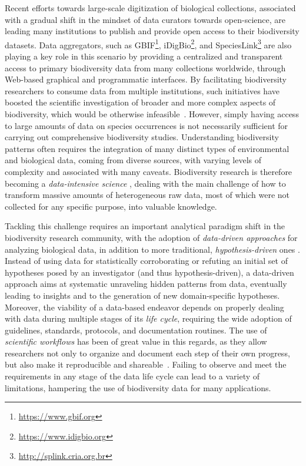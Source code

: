 Recent efforts towards large-scale digitization of biological collections, associated with a gradual shift in the mindset of data curators towards open-science, are leading many institutions to publish and provide open access to their biodiversity datasets.
Data aggregators, such as GBIF\footnote{\url{https://www.gbif.org}}, iDigBio\footnote{\url{https://www.idigbio.org}}, and SpeciesLink\footnote{\url{http://splink.cria.org.br}} are also playing a key role in this scenario by providing a centralized and transparent access to primary biodiversity data from many collections worldwide, through Web-based graphical and programmatic interfaces.
By facilitating biodiversity researchers to consume data from multiple institutions, such initiatives have boosted the scientific investigation of broader and more complex aspects of biodiversity, which would be otherwise infeasible~\cite{James2018, Newbold2015}.
However, simply having access to large amounts of data on species occurrences is not necessarily sufficient for carrying out comprehensive biodiversity studies.
Understanding biodiversity patterns often requires the integration of many distinct types of environmental and biological data, coming from diverse sources, with varying levels of complexity and associated with many caveats.
Biodiversity research is therefore becoming a \textit{data-intensive science} \cite{Kelling2009}, dealing with the main challenge of how to transform massive amounts of heterogeneous raw data, most of which were not collected for any specific purpose, into valuable knowledge.

Tackling this challenge requires an important analytical paradigm shift in the biodiversity research community, with the adoption of \textit{data-driven approaches} for analyzing biological data, in addition to more traditional, \textit{hypothesis-driven} ones \cite{Kelling2009}.
Instead of using data for statistically corroborating or refuting an initial set of hypotheses posed by an investigator (and thus hypothesis-driven), a data-driven approach aims at systematic unraveling hidden patterns from data, eventually leading to insights and to the generation of new domain-specific hypotheses.
%
Moreover, the viability of a data-based endeavor depends on properly dealing with data during multiple stages of its \textit{life cycle}, requiring the wide adoption of guidelines, standards, protocols, and documentation routines.
The use of \textit{scientific workflows} has been of great value in this regards, as they allow researchers not only to organize and document each step of their own progress, but also make it reproducible and shareable~\cite{Kelling2009,Talbert2013a,Reichman2011}.
Failing to observe and meet the requirements in any stage of the data life cycle can lead to a variety of limitations, hampering the use of biodiversity data for many applications.

